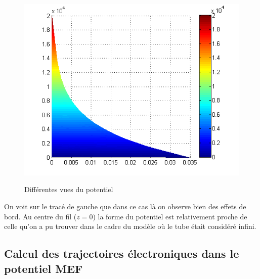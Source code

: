 \documentclass[a4paper,12pt]{article}
\begin{document}
\begin{figure}[h]
\begin{minipage}[c]{.32\linewidth}
      \includegraphics[width=1\textwidth,height=0.8\textwidth]{images/v_yz}
      \label{f v_yz}
   \end{minipage}
   \caption{Différentes vues du potentiel}
   \label{f v}
\end{figure}
On voit sur le tracé de gauche que dans ce cas là on observe bien des effets de bord. Au centre du fil ($z=0$) la forme du potentiel est relativement proche de celle qu'on a pu trouver dans le cadre du modèle où le tube était considéré infini.







\subsection{Calcul des trajectoires électroniques dans le potentiel MEF}
\end{document}
